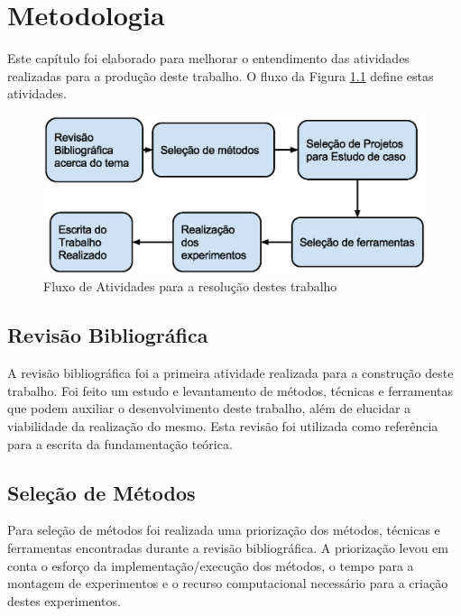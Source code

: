 \chapter[Metodologia]{Metodologia}


Este capítulo foi elaborado para melhorar o entendimento das atividades
 realizadas para a produção deste trabalho. O fluxo da Figura 
\ref{fig:fases_metodologia} define estas atividades.

\begin{figure}[h]
    \centering
        \includegraphics[keepaspectratio=true,scale=0.7]{figuras/fases_metodologia.eps}
    \caption{Fluxo de Atividades para a resolução destes trabalho}
    \label{fig:fases_metodologia}
\end{figure}


\section{Revisão Bibliográfica}

A revisão bibliográfica foi a primeira atividade realizada para a construção
 deste trabalho. Foi feito um estudo e levantamento de métodos, técnicas e
 ferramentas que podem auxiliar o desenvolvimento deste trabalho, além de
 elucidar a viabilidade da realização do mesmo. Esta revisão foi utilizada
 como referência para a  escrita da fundamentação teórica.

\section{Seleção de Métodos}

Para seleção de métodos foi realizada uma priorização dos métodos, técnicas e
 ferramentas encontradas durante a revisão bibliográfica. A priorização levou
 em conta o esforço da implementação/execução dos métodos, o tempo para a
 montagem de experimentos e o recurso computacional necessário para a criação
 destes experimentos.


